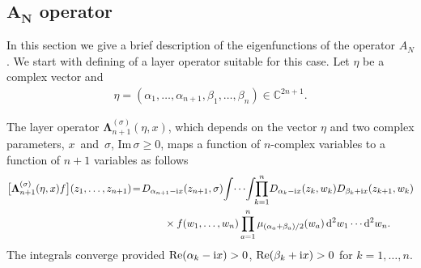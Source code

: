 \subsection[AN operator]{$\boldsymbol{A_N}$ operator}%

In this section we give a brief description of the eigenfunctions of the operator $A_N$. We start with defining of a layer operator
suitable for this case. Let $\eta$ be a complex vector and
\begin{gather}\label{gamma-A}
\eta=(\alpha_1,\dots,\alpha_{n+1},\beta_{1},\dots,\beta_n) \in \mathbb C^{2n+1} .
\end{gather}
{\samepage
The layer operator $\boldsymbol \Lambda_{n+1}^{(\sigma)}(\eta,x)$, which depends on the vector $\eta$ and two complex parameters, $x$~and~$\sigma$, $\textrm{Im}\,\sigma\geq 0$, maps a function of $n$-complex variables to a function of $n+1$ variables as follows
\begin{gather}
\big[\boldsymbol\Lambda^{(\sigma)}_{n+1}(\eta,x) f\big](z_1,\dots,z_{n+1}) \!=\!D_{\alpha_{n+1}-{\rm i}x}(z_{n+1},\sigma)\!\int\! \cdots\!\int\!\!
\prod_{k=1}^{n}\! D_{\alpha_k-{\rm i}x}(z_k,w_k) D_{\beta_{k}+{\rm i}x}(z_{k+1},w_k)\notag
\\ \hphantom{\big[\boldsymbol\Lambda^{(\sigma)}_{n+1}(\eta,x) f\big](z_1,\dots,z_{n+1}) \!=}
{}\times f(w_1,\dots,w_{n}) \prod_{a=1}^n
\mu_{{(\alpha_a+\beta_{a})}/2}(w_a)
\, {\rm d}^2w_1\cdots {\rm d}^2w_n.\label{Lambda-A}
\end{gather}
The integrals converge provided $\mathop{\rm Re}(\alpha_k-{\rm i}x)>0$,
$\mathop{\rm Re}(\beta_{k}+{\rm i}x)>0$ for $k=1,\dots,n$.

}

